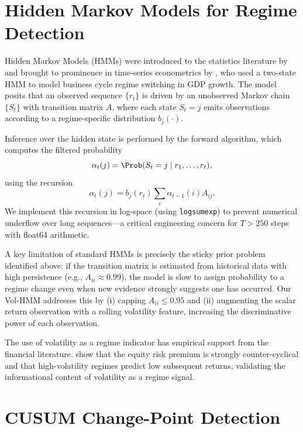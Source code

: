\section{Hidden Markov Models for Regime Detection}

Hidden Markov Models (HMMs) were introduced to the statistics literature by
\textcite{baum1966statistical} and brought to prominence in time-series
econometrics by \textcite{hamilton1989new}, who used a two-state HMM to
model business cycle regime switching in GDP growth. The model posits that
an observed sequence $\{r_t\}$ is driven by an unobserved Markov chain
$\{S_t\}$ with transition matrix $A$, where each state $S_t = j$ emits
observations according to a regime-specific distribution $b_j(\cdot)$.

Inference over the hidden state is performed by the forward algorithm, which
computes the filtered probability
\[
    \alpha_t(j) = \Prob(S_t = j \mid r_1, \ldots, r_t),
\]
using the recursion
\[
    \alpha_t(j) = b_j(r_t) \sum_{i} \alpha_{t-1}(i) A_{ij}.
\]
We implement this recursion in log-space (using \texttt{logsumexp}) to
prevent numerical underflow over long sequences---a critical engineering
concern for $T > 250$ steps with float64 arithmetic.

A key limitation of standard HMMs is precisely the sticky prior problem
identified above: if the transition matrix is estimated from historical data
with high persistence (e.g., $A_{ii} \approx 0.99$), the model is slow to
assign probability to a regime change even when new evidence strongly suggests
one has occurred. Our Vol-HMM addresses this by (i) capping $A_{ii} \leq
0.95$ and (ii) augmenting the scalar return observation with a rolling
volatility feature, increasing the discriminative power of each observation.

The use of volatility as a regime indicator has empirical support from the
financial literature. \textcite{ang2002regime} show that the equity
risk premium is strongly counter-cyclical and that high-volatility regimes
predict low subsequent returns, validating the informational content of
volatility as a regime signal.

\section{CUSUM Change-Point Detection}


